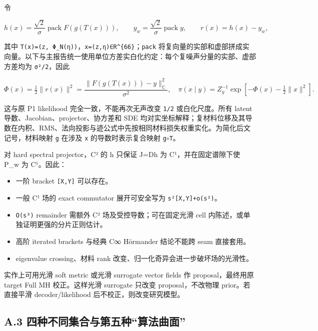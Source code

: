 \documentclass[
  11pt,
  a4paper,
]{article}
\providecommand{\tightlist}{%
  \setlength{\itemsep}{0pt}\setlength{\parskip}{0pt}}
\begin{document}
令

\[
h(x)=\frac{\sqrt2}{\sigma}\operatorname{pack}F(g(T(x))),\qquad
y_w=\frac{\sqrt2}{\sigma}\operatorname{pack}y,\qquad r(x)=h(x)-y_w,
\]

其中
\texttt{T(x)=(z,\ Φ\_\allowbreak{}N(η))}，\texttt{x=(z,η)∈R\^{}\{66\}}；\nolinkurl{pack}
将复向量的实部和虚部拼成实向量。以下与主报告统一使用单位方差实白化约定：每个复噪声分量的实部、虚部方差均为
\texttt{σ²/2}，因此

\[
\Phi(x)=\tfrac12\|r(x)\|^2
=\frac{\|F(g(T(x)))-y\|_{\mathbb{C}}^2}{\sigma^2},\quad
\pi(x\mid y)=Z_y^{-1}\exp[-\Phi(x)-\tfrac12\|x\|^2].
\]

这与原 P1 likelihood 完全一致，不能再次无声改变 \nolinkurl{1/2}
或白化尺度。所有 latent 导数、Jacobian、projector、协方差和 SDE
均对实坐标解释；复材料位移及其导数在内积、RMS、法向投影与迹公式中先按相同材料损失权重实化。为简化后文记号，材料映射
\nolinkurl{g} 在涉及 \nolinkurl{x} 的导数时表示复合映射 \texttt{g\(\circ\)T}。

对 hard spectral projector，C² 的 h 只保证 J=Dh 为 C¹，并在固定谱隙下使
P\_\allowbreak{}w 为 C¹。因此：

\begin{itemize}
\tightlist
\item
  一阶 bracket \texttt{{[}X,Y{]}} 可以存在。
\item
  一般 C¹ 场的 exact commutator 展开可安全写为
  \texttt{s²{[}X,Y{]}+o(s²)}。
\item
  \texttt{O(s³)} remainder 需额外 C² 场及受控导数；可在固定光滑 cell
  内陈述，或单独证明更强的分片正则估计。
\item
  高阶 iterated brackets 与经典 C∞ Hörmander 结论不能跨 seam 直接套用。
\item
  eigenvalue crossing、材料 rank
  改变、归一化奇异会进一步破坏场的光滑性。
\end{itemize}

实作上可用光滑 soft metric 或光滑 surrogate vector fields 作
proposal，最终用原 target Full MH 校正。这样光滑 surrogate 只改变
proposal，不改物理 prior。若直接平滑 decoder/likelihood
后不校正，则改变研究模型。

\hypertarget{a.3-ux56dbux79cdux4e0dux540cux96c6ux5408ux4e0eux7b2cux4e94ux79cdux7b97ux6cd5ux66f2ux9762}{%
\subsection{A.3
四种不同集合与第五种``算法曲面''}\label{a.3-ux56dbux79cdux4e0dux540cux96c6ux5408ux4e0eux7b2cux4e94ux79cdux7b97ux6cd5ux66f2ux9762}}
\end{document}
